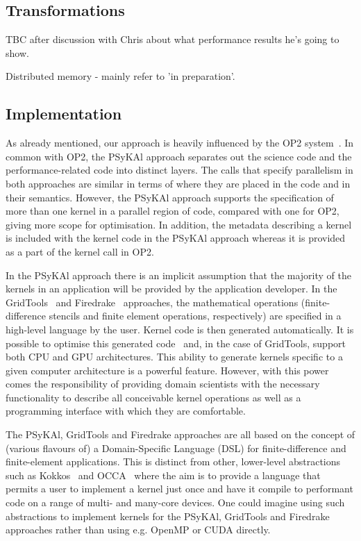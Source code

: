 \documentclass[times]{elsarticle}
\begin{document}
\subsection{Transformations}

TBC after discussion with Chris about what performance results he's going to show.

Distributed memory - mainly refer to 'in preparation'.

\subsection{Implementation}

As already mentioned, our approach is heavily influenced by the OP2
system~\citep{OP2, PYOP2}.
In common with OP2, the {PS}y{KA}l approach separates out the science
code and the performance-related code into distinct layers. The calls
that specify parallelism in both approaches are similar in terms of
where they are placed in the code and in their semantics. However, the
{PS}y{KA}l approach supports the specification of more than one kernel
in a parallel region of code, compared with one for OP2, giving more
scope for optimisation. In addition, the metadata describing a kernel
is included with the kernel code in the {PS}y{KA}l approach whereas it
is provided as a part of the kernel call in OP2.

In the {PS}y{KA}l approach there is an implicit assumption that the
majority of the kernels in an application will be provided by the
application developer. In the GridTools~\citep{grid_tools} and
Firedrake~\citep{firedrake,fenics} approaches, the mathematical
operations (finite-difference stencils and finite element operations,
respectively) are specified in a high-level language by the
user. Kernel code is then generated automatically. It is possible to
optimise this generated code~\citep{coffee} and, in the case of
GridTools, support both CPU and GPU architectures. This ability to
generate kernels specific to a given computer architecture is a
powerful feature. However, with this power comes the responsibility of
providing domain scientists with the necessary functionality to
describe all conceivable kernel operations as well as a programming
interface with which they are comfortable.

The {PS}y{KA}l, GridTools and Firedrake approaches are all based on
the concept of (various flavours of) a Domain-Specific Language (DSL)
for finite-difference and finite-element applications. This is
distinct from other, lower-level abstractions such as
Kokkos~\citep{kokkos} and OCCA~\citep{occa} where the aim is to
provide a language that permits a user to implement a kernel just once
and have it compile to performant code on a range of multi- and
many-core devices. One could imagine using such abstractions to
implement kernels for the {PS}y{KA}l, GridTools and Firedrake
approaches rather than using e.g. OpenMP or CUDA directly.
\end{document}
